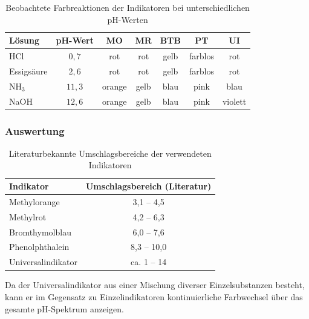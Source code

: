 \begin{table}[H]
    \centering
    \caption{Beobachtete Farbreaktionen der Indikatoren bei unterschiedlichen pH-Werten}
    \label{tab:indikator_beobachtung}
    \begin{tabular}{|l|c|c|c|c|c|c|}
        \hline
        \textbf{Lösung} & \textbf{pH-Wert} & \textbf{MO} & \textbf{MR} & \textbf{BTB} & \textbf{PT} & \textbf{UI} \\
        \hline
        HCl             & $ 0,7$           & rot         & rot         & gelb         & farblos     & rot         \\
        Essigsäure      & $ 2,6$           & rot         & rot         & gelb         & farblos     & rot         \\
        NH$_3$          & $ 11,3$          & orange      & gelb        & blau         & pink        & blau        \\
        NaOH            & $ 12,6$          & orange      & gelb        & blau         & pink        & violett     \\
        \hline
    \end{tabular}
\end{table}

\subsubsection{Auswertung}
\begin{table}[H]
    \centering
    \caption{Literaturbekannte Umschlagsbereiche der verwendeten Indikatoren}
    \label{tab:indikatoren}
    \begin{tabular}{|l|c|}
        \hline
        \textbf{Indikator} & \textbf{Umschlagsbereich (Literatur)} \\
        \hline
        Methylorange       & 3,1 -- 4,5                            \\
        Methylrot          & 4,2 -- 6,3                            \\
        Bromthymolblau     & 6,0 -- 7,6                            \\
        Phenolphthalein    & 8,3 -- 10,0                           \\
        Universalindikator & ca. 1 -- 14                           \\
        \hline
    \end{tabular}
\end{table}

Da der Universalindikator aus einer Mischung diverser Einzelsubstanzen besteht, kann er im Gegensatz zu Einzelindikatoren kontinuierliche Farbwechsel über das gesamte pH-Spektrum anzeigen. \cite{noauthor_universalindikator_nodate}

